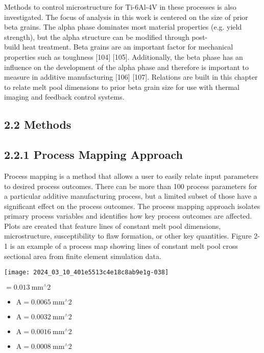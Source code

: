 \documentclass[10pt]{article}
\begin{document}
Methods to control microstructure for Ti-6Al-4V in these processes is also investigated. The focus of analysis in this work is centered on the size of prior beta grains. The alpha phase dominates most material properties (e.g. yield strength), but the alpha structure can be modified through post-\\
build heat treatment. Beta grains are an important factor for mechanical properties such as toughness [104] [105]. Additionally, the beta phase has an influence on the development of the alpha phase and therefore is important to measure in additive manufacturing [106] [107]. Relations are built in this chapter to relate melt pool dimensions to prior beta grain size for use with thermal imaging and feedback control systems.

\subsection*{2.2 Methods}
\subsection*{2.2.1 Process Mapping Approach}
Process mapping is a method that allows a user to easily relate input parameters to desired process outcomes. There can be more than 100 process parameters for a particular additive manufacturing process, but a limited subset of those have a significant effect on the process outcomes. The process mapping approach isolates primary process variables and identifies how key process outcomes are affected. Plots are created that feature lines of constant melt pool dimensions, microstructure, susceptibility to flaw formation, or other key quantities. Figure 2-1 is an example of a process map showing lines of constant melt pool cross sectional area from finite element simulation data.

\begin{center}
\texttt{[image: 2024\_03\_10\_401e5513c4e18c8ab9e1g-038]}
\end{center}

$=0.013 \mathrm{~mm}^{\wedge} 2$

\begin{itemize}
  \item $\mathrm{A}=0.0065 \mathrm{~mm}^{\wedge} 2$
  \item $\mathrm{A}=0.0032 \mathrm{~mm}^{\wedge} 2$
  \item $\mathrm{A}=0.0016 \mathrm{~mm}^{\wedge} 2$
  \item $\mathrm{A}=0.0008 \mathrm{~mm}^{\wedge} 2$
\end{itemize}
\end{document}
